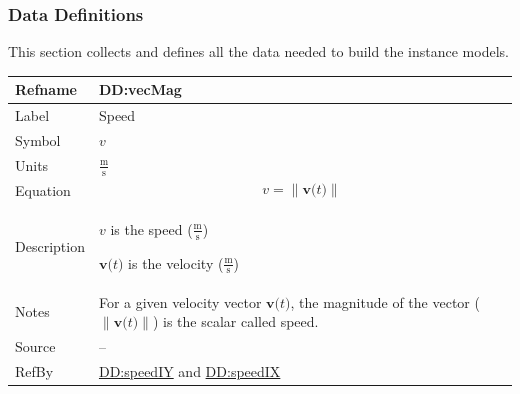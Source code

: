 \documentclass[12pt]{article}
\begin{document}
\subsubsection{Data Definitions}
\label{Sec:DDs}
This section collects and defines all the data needed to build the instance models.

\medskip
\noindent
\begin{minipage}{\textwidth}
\begin{tabular}{>{\raggedright}p{}>{\raggedright\arraybackslash}p{}}
\toprule \textbf{Refname} & \textbf{DD:vecMag}
\label{DD:vecMag}
\\ \midrule
Label & Speed
        
\\ \midrule
Symbol & $v$
         
\\ \midrule
Units & $\frac{\text{m}}{\text{s}}$
        
\\ \midrule
Equation & \begin{displaymath}
           v=\|\symbf{v}\text{(}t\text{)}\|
           \end{displaymath}
\\ \midrule
Description & \begin{symbDescription}
              \item{$v$ is the speed ($\frac{\text{m}}{\text{s}}$)}
              \item{$\symbf{v}\text{(}t\text{)}$ is the velocity ($\frac{\text{m}}{\text{s}}$)}
              \end{symbDescription}
\\ \midrule
Notes & For a given velocity vector $\symbf{v}\text{(}t\text{)}$, the magnitude of the vector ($\|\symbf{v}\text{(}t\text{)}\|$) is the scalar called speed.
        
\\ \midrule
Source & --
         
\\ \midrule
RefBy & \hyperref[DD:speedIY]{DD:speedIY} and \hyperref[DD:speedIX]{DD:speedIX}
        
\\ \bottomrule
\end{tabular}
\end{minipage}
\end{document}
